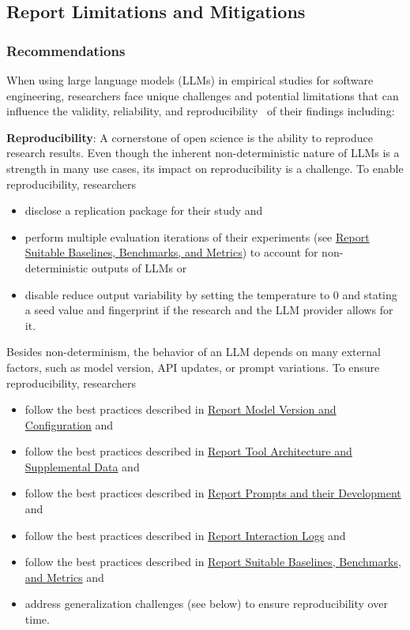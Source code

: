 



\subsection{Report Limitations and Mitigations}
\subsubsection{Recommendations}
When using large language models (LLMs) in empirical studies for software engineering, researchers face unique challenges and potential limitations that can influence the validity, reliability, and reproducibility~\cite{sallou2024breaking} of their findings including:

\textbf{Reproducibility}:
A cornerstone of open science is the ability to reproduce research results. Even though the inherent non-deterministic nature of LLMs is a strength in many use cases, its impact on reproducibility is a challenge. To enable reproducibility, researchers 
\begin{itemize}
  \item \must disclose a replication package for their study and %
  \item \should perform multiple evaluation iterations of their experiments (see \href{/guidelines/report-baselines-benchmarks-and-metrics}{Report Suitable Baselines, Benchmarks, and Metrics}) to account for non-deterministic outputs of LLMs or
  \item \may disable reduce output variability by setting the temperature to 0 and stating a seed value and fingerprint if the research and the LLM provider allows for it.
\end{itemize}
Besides non-determinism, the behavior of an LLM depends on many external factors, such as model version, API updates, or prompt variations. To ensure reproducibility, researchers
\begin{itemize}
  \item \should follow the best practices described in \href{/guidelines/report-version-and-configuration}{Report Model Version and Configuration} and
  \item \should follow the best practices described in \href{/guidelines/report-architecture-and-data}{Report Tool Architecture and Supplemental Data} and
  \item \should follow the best practices described in \href{/guidelines/report-prompts}{Report Prompts and their Development} and
  \item \should follow the best practices described in \href{/guidelines/report-interaction-logs}{Report Interaction Logs} and
  \item \should follow the best practices described in \href{/guidelines/report-baselines-benchmarks-and-metrics}{Report Suitable Baselines, Benchmarks, and Metrics} and
  \item \should address generalization challenges (see below) to ensure reproducibility over time.
\end{itemize}


